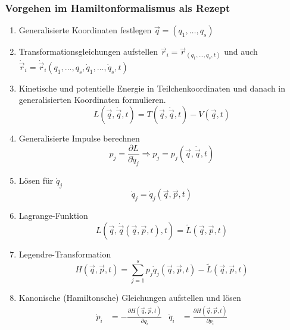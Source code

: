 \documentclass[oneside]{book}
\theoremstyle{definition}
\newcommand{\ffpartial}[2]{\frac{\partial #1}{\partial #2}}
\newcommand{\dotvec}[1]{\dot{\vec{#1}}}
\begin{document}
\subsubsection{Vorgehen im Hamiltonformalismus als Rezept}
\begin{enumerate}
	\item Generalisierte Koordinaten festlegen $\vec{q} = (q_1, \dots, q_s)$
	\item Transformationsgleichungen aufstellen $\vec{r}_i = \vec{r}_(q_1, \dots, q_s, t)$ und auch $\dotvec{r}_i = \dotvec{r}_i(q_1, \dots, q_s, \dot{q}_1, \dots, \dot{q}_s, t)$
	\item Kinetische und potentielle Energie in Teilchenkoordinaten und danach in generalisierten Koordinaten formulieren.
	$$L(\vec{q}, \dotvec{q}, t) = T(\vec{q}, \dotvec q,t)  - V(\vec{q}, t)$$
	\item Generalisierte Impulse berechnen
		$$p_j = \ffpartial{L}{\dot{q}_j} \Rightarrow p_j = p_j(\vec{q}, \dotvec{q}, t)$$
	\item Lösen für $\dot{q}_j$
	$$\dot{q}_j = \dot{q}_j (\vec{q}, \vec{p}, t)$$
	\item Lagrange-Funktion
	$$L(\vec{q}, \dotvec{q}(\vec{q}, \vec{p}, t), t) = \tilde{L}(\vec{q}, \vec{p}, t)$$
	\item Legendre-Transformation
	$$H(\vec{q}, \vec{p}, t) = \sum_{j=1}^s p_j \dot{q}_j(\vec{q}, \vec{p}, t) - \tilde{L}(\vec{q}, \vec{p}, t)$$
	\item Kanonische (Hamiltonsche) Gleichungen aufstellen und lösen
	\begin{align*}
	\dot{p}_i &= -\ffpartial{H(\vec{q},\vec{p},t)}{q_i} & \dot{q}_i &= \ffpartial{H(\vec{q},\vec{p},t)}{p_i}
	\end{align*}
\end{enumerate}
\end{document}
